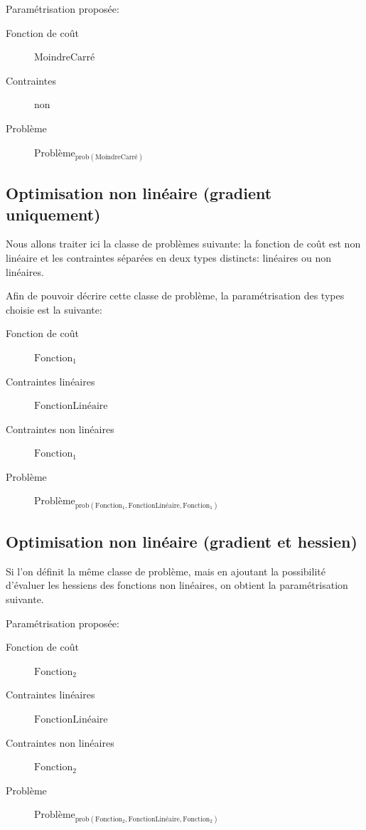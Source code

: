 \begin{myexample}\label{ex:chap1_leastsquare}
  Paramétrisation proposée:
  \begin{description}
  \item[Fonction de coût] $\text{MoindreCarré}$
  \item[Contraintes] non
  \item[Problème] $\text{Problème}_{\text{prob}(\text{MoindreCarré})}$
  \end{description}
\end{myexample}


\subsection{Optimisation non linéaire (gradient uniquement)}
\label{sec:chap1_model2impl_typage_ex_optimgrad}

Nous allons traiter ici la classe de problèmes suivante: la fonction
de coût est non linéaire et les contraintes séparées en deux types
distincts: linéaires ou non linéaires.

\begin{myexample}\label{ex:chap1_cfsqp}
  Afin de pouvoir décrire cette classe de problème, la paramétrisation des types choisie est la suivante:
  \begin{description}
  \item[Fonction de coût] $\text{Fonction}_1$
  \item[Contraintes linéaires] $\text{FonctionLinéaire}$
  \item[Contraintes non linéaires] $\text{Fonction}_1$
  \item[Problème] $\text{Problème}_{\text{prob}(\text{Fonction}_1, \text{FonctionLinéaire}, \text{Fonction}_1)}$
  \end{description}
\end{myexample}

\subsection{Optimisation non linéaire (gradient et hessien)}
\label{sec:chap1_model2impl_typage_ex_optimhess}

Si l'on définit la même classe de problème, mais en ajoutant la
possibilité d'évaluer les hessiens des fonctions non linéaires, on
obtient la paramétrisation suivante.

\begin{myexample}\label{ex:chap1_ipopt}
  Paramétrisation proposée:
  \begin{description}
  \item[Fonction de coût] $\text{Fonction}_2$
  \item[Contraintes linéaires] $\text{FonctionLinéaire}$
  \item[Contraintes non linéaires] $\text{Fonction}_2$
  \item[Problème] $\text{Problème}_{\text{prob}(\text{Fonction}_2, \text{FonctionLinéaire}, \text{Fonction}_2)}$
  \end{description}
\end{myexample}

